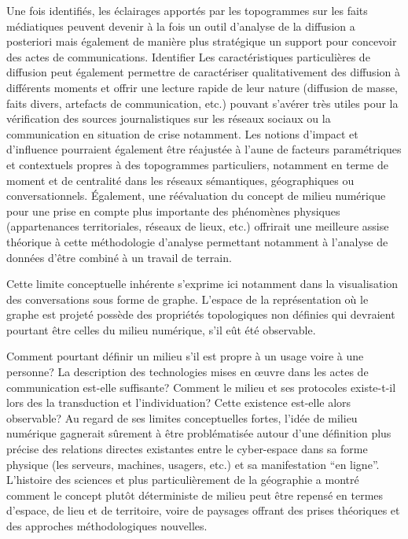 Une fois identifiés, les éclairages apportés par les topogrammes sur les faits médiatiques peuvent devenir à la fois un outil d{\textquoteright}analyse de la diffusion a posteriori mais également de manière plus stratégique un support pour concevoir des actes de communications. Identifier Les caractéristiques particulières de diffusion peut également permettre de caractériser qualitativement des diffusion à différents moments et offrir une lecture rapide de leur nature (diffusion de masse, faits divers, artefacts de communication, etc.) pouvant s{\textquoteright}avérer très utiles pour la vérification des sources journalistiques sur les réseaux sociaux ou la communication en situation de crise notamment. Les notions d{\textquoteright}impact et d{\textquoteright}influence pourraient également être réajustée à l{\textquoteright}aune de facteurs paramétriques et contextuels propres à des topogrammes particuliers, notamment en terme de moment et de centralité dans les réseaux sémantiques, géographiques ou conversationnels. Également, une réévaluation du concept de milieu numérique pour une prise en compte plus importante des phénomènes physiques (appartenances territoriales, réseaux de lieux, etc.) offrirait une meilleure assise théorique à cette méthodologie d{\textquoteright}analyse permettant notamment à l{\textquoteright}analyse de données d{\textquoteright}être combiné à un travail de terrain. 

Cette limite conceptuelle inhérente s{\textquoteright}exprime ici notamment dans la visualisation des conversations sous forme de graphe. L'espace de la représentation où le graphe est projeté possède des propriétés topologiques non définies qui devraient pourtant être celles du milieu numérique, s'il eût été observable. 

Comment pourtant définir un milieu s{\textquoteright}il est propre à un usage voire à une personne? La description des technologies mises en {\oe}uvre dans les actes de communication est-elle suffisante? Comment le milieu et ses protocoles existe-t-il lors des la transduction et l{\textquoteright}individuation? Cette existence est-elle alors observable? Au regard de ses limites conceptuelles fortes, l{\textquoteright}idée de milieu numérique gagnerait s\^urement à être problématisée autour d{\textquoteright}une définition plus précise des relations directes existantes entre le cyber-espace dans sa forme physique (les serveurs, machines, usagers, etc.) et sa manifestation {\textquotedblleft}en ligne{\textquotedblright}. L{\textquoteright}histoire des sciences et plus particulièrement de la géographie a montré comment le concept plut\^ot déterministe de milieu peut être repensé en termes d{\textquoteright}espace, de lieu et de territoire, voire de paysages offrant des prises théoriques et des approches méthodologiques nouvelles. 

